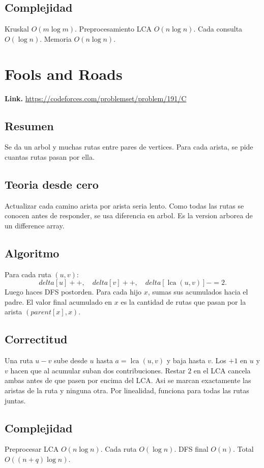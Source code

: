 \documentclass[10pt]{article}
\newcommand{\bigO}{O}
\newcommand{\lca}{\operatorname{lca}}
\begin{document}
\subsection*{Complejidad}
Kruskal $\bigO(m\log m)$. Preprocesamiento LCA $\bigO(n\log n)$. Cada consulta
$\bigO(\log n)$. Memoria $\bigO(n\log n)$.

\clearpage
\section{Fools and Roads}
\textbf{Link.} \url{https://codeforces.com/problemset/problem/191/C}

\subsection*{Resumen}
Se da un arbol y muchas rutas entre pares de vertices. Para cada arista, se pide
cuantas rutas pasan por ella.

\subsection*{Teoria desde cero}
Actualizar cada camino arista por arista seria lento. Como todas las rutas se
conocen antes de responder, se usa diferencia en arbol. Es la version arborea de
un difference array.

\subsection*{Algoritmo}
Para cada ruta $(u,v)$:
\[
delta[u]++,\quad delta[v]++,\quad delta[\lca(u,v)]-=2.
\]
Luego haces DFS postorden. Para cada hijo $x$, sumas sus acumulados hacia el
padre. El valor final acumulado en $x$ es la cantidad de rutas que pasan por la
arista $(parent[x],x)$.

\subsection*{Correctitud}
Una ruta $u-v$ sube desde $u$ hasta $a=\lca(u,v)$ y baja hasta $v$. Los $+1$ en
$u$ y $v$ hacen que al acumular suban dos contribuciones. Restar $2$ en el LCA
cancela ambas antes de que pasen por encima del LCA. Asi se marcan exactamente
las aristas de la ruta y ninguna otra. Por linealidad, funciona para todas las
rutas juntas.

\subsection*{Complejidad}
Preprocesar LCA $\bigO(n\log n)$. Cada ruta $\bigO(\log n)$. DFS final
$\bigO(n)$. Total $\bigO((n+q)\log n)$.
\end{document}
